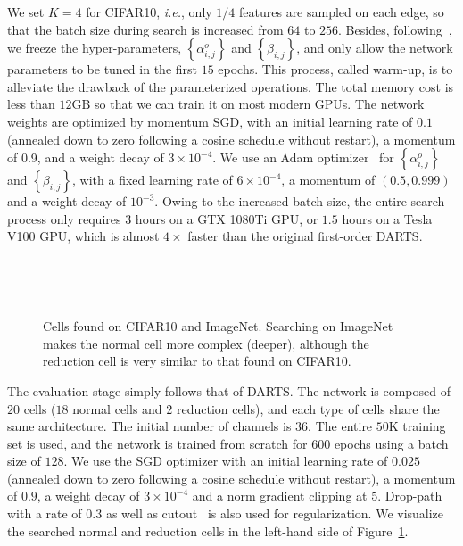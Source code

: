 \documentclass{article} \usepackage{iclr2020_conference,times}
\begin{document}
We set ${K}={4}$ for CIFAR10, \textit{i.e.}, only $1/4$ features are sampled on each edge, so that the batch size during search is increased from $64$ to $256$. Besides, following~\citep{chen2019progressive}, we freeze the hyper-parameters, $\left\{\alpha_{i,j}^o\right\}$ and $\left\{\beta_{i,j}\right\}$, and only allow the network parameters to be tuned in the first $15$ epochs. This process, called warm-up, is to alleviate the drawback of the parameterized operations. The total memory cost is less than $12\mathrm{GB}$ so that we can train it on most modern GPUs. The network weights are optimized by momentum SGD, with an initial learning rate of $0.1$ (annealed down to zero following a cosine schedule without restart), a momentum of 0.9, and a weight decay of $3\times10^{-4}$. We use an Adam optimizer~\citep{kingma2014adam} for $\left\{\alpha_{i,j}^o\right\}$ and $\left\{\beta_{i,j}\right\}$, with a fixed learning rate of $6\times10^{-4}$, a momentum of $(0.5,0.999)$ and a weight decay of $10^{-3}$. Owing to the increased batch size, the entire search process only requires $3$ hours on a GTX 1080Ti GPU, or $1.5$ hours on a Tesla V100 GPU, which is almost $4\times$ faster than the original first-order DARTS.

\begin{figure}[t]
\centering
\begin{minipage}{0.49\textwidth}
\label{ncells_s1}\\
\label{ncells_s2}
\end{minipage}
\begin{minipage}{0.49\textwidth}
\label{ncells_s3}\\
\begin{center}
\label{ncells_dv2}
\end{center}
\end{minipage}
\caption{Cells found on CIFAR10 and ImageNet. Searching on ImageNet makes the normal cell more complex (deeper), although the reduction cell is very similar to that found on CIFAR10.}
\label{fig:cells}
\end{figure}

The evaluation stage simply follows that of DARTS. The network is composed of $20$ cells ($18$ normal cells and $2$ reduction cells), and each type of cells share the same architecture. The initial number of channels is $36$. The entire $50\mathrm{K}$ training set is used, and the network is trained from scratch for $600$ epochs using a batch size of $128$. We use the SGD optimizer with an initial learning rate of $0.025$ (annealed down to zero following a cosine schedule without restart), a momentum of $0.9$, a weight decay of $3\times10^{-4}$ and a norm gradient clipping at $5$. Drop-path with a rate of $0.3$ as well as cutout~\citep{devries2017improved} is also used for regularization. We visualize the searched normal and reduction cells in the left-hand side of Figure~\ref{fig:cells}.
\end{document}
